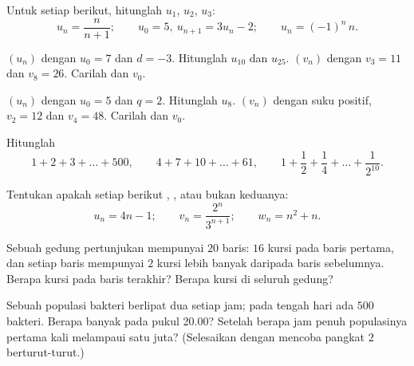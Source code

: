 \begin{exercise}[$\star$]\label{exo:g11:seq:1}
Untuk setiap  berikut, hitunglah $u_1$, $u_2$, $u_3$:
\[
u_n = \frac{n}{n+1}; \qquad
u_0 = 5,\ u_{n+1} = 3u_n - 2; \qquad
u_n = (-1)^n\,n .
\]
\end{exercise}

\begin{exercise}[$\star$]\label{exo:g11:seq:2}
$(u_n)$  dengan $u_0 = 7$ dan $d = -3$. Hitunglah $u_{10}$ dan
$u_{25}$. $(v_n)$  dengan $v_3 = 11$ dan $v_8 = 26$. Carilah
 dan $v_0$.
\end{exercise}

\begin{exercise}[$\star$]\label{exo:g11:seq:3}
$(u_n)$  dengan $u_0 = 5$ dan $q = 2$. Hitunglah $u_8$. $(v_n)$
 dengan suku positif, $v_2 = 12$ dan $v_4 = 48$. Carilah 
dan $v_0$.
\end{exercise}

\begin{exercise}[$\star$]\label{exo:g11:seq:4}
Hitunglah
\[
1 + 2 + 3 + \dots + 500, \qquad
4 + 7 + 10 + \dots + 61, \qquad
1 + \frac12 + \frac14 + \dots + \frac{1}{2^{10}} .
\]
\end{exercise}

\begin{exercise}[$\star$]\label{exo:g11:seq:5}
Tentukan apakah setiap  berikut , , atau bukan keduanya:
\[
u_n = 4n - 1; \qquad
v_n = \frac{2^n}{3^{n+1}}; \qquad
w_n = n^2 + n .
\]
\end{exercise}

\begin{exercise}[$\star\star$]\label{exo:g11:seq:6}
Sebuah gedung pertunjukan mempunyai $20$ baris: $16$ kursi pada baris pertama,
dan setiap baris mempunyai $2$ kursi lebih banyak daripada baris sebelumnya.
Berapa kursi pada baris terakhir? Berapa kursi di seluruh gedung?
\end{exercise}

\begin{exercise}[$\star\star$]\label{exo:g11:seq:7}
Sebuah populasi bakteri berlipat dua setiap jam; pada tengah hari ada $500$
bakteri. Berapa banyak pada pukul 20.00? Setelah berapa jam penuh populasinya
pertama kali melampaui satu juta? (Selesaikan dengan mencoba pangkat
$2$ berturut-turut.)
\end{exercise}

